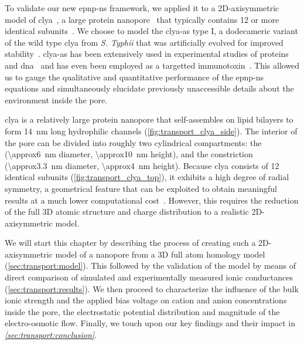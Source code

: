 To validate our new \gls{epnp-ns} framework, we applied it to a 2D-axisymmetric model of
\gls{clya}~\cite{Mueller-2009}, a large protein nanopore~\cite{Soskine-2012} that typically contains 12 or
more identical subunits~\cite{Soskine-2013,Peng-2019}. We choose to model the \gls{clya-as} type I, a
dodecameric variant of the wild type \gls{clya} from \textit{S. Typhii} that was artificially evolved for
improved stability~\cite{Soskine-2013}. \Gls{clya-as} has been extensively used in experimental studies of
proteins~\cite{Soskine-2013,VanMeervelt-2014,Soskine-Biesemans-2015,Biesemans-2015,Wloka-2017,
VanMeervelt-2017,Galenkamp-2018,Willems-Ruic-Biesemans-2019,Zernia-2020,Galenkamp-2020} and
\gls{dna}~\cite{Franceschini-2013,Franceschini-2016,Nomidis-2018} and has even been employed as a targetted
immunotoxin~\cite{Mutter-2018}. This allowed us to gauge the qualitative and quantitative performance of the
\gls{epnp-ns} equations and simultaneously elucidate previously unaccessible details about the environment
inside the pore.

\Gls{clya} is a relatively large protein nanopore that self-assembles on lipid bilayers to form \SI{14}{\nm}
long hydrophilic channels (\cref{fig:transport_clya_side}). The interior of the pore can be divided into
roughly two cylindrical compartments: the \cisi{} \lumen{} (\SI{\approx6}{\nm} diameter, \SI{\approx10}{\nm}
height), and the \transi{} constriction (\SI{\approx3.3}{\nm} diameter, \SI{\approx4}{\nm} height). Because
\gls{clya} consists of 12 identical subunits (\cref{fig:transport_clya_top}), it exhibits a high degree of
radial symmetry, a geometrical feature that can be exploited to obtain meaningful results at a much lower
computational cost~\cite{Cervera-2005,Lu-2012,Pederson-2015}. However, this requires the reduction of the full
3D atomic structure and charge distribution to a realistic 2D-axisymmetric model.

We will start this chapter by describing the process of creating such a 2D-axisymmetric model of a nanopore
from a 3D full atom homology model (\cref{sec:transport:model}). This followed by the validation of the model
by means of direct comparison of simulated and experimentally measured ionic conductances
(\cref{sec:transport:results}). We then proceed to characterize the influence of the bulk ionic strength and
the applied bias voltage on cation and anion concentrations inside the pore, the electrostatic potential
distribution and magnitude of the electro-osmotic flow. Finally, we touch upon our key findings and their
impact in \emph{\cref{sec:transport:conclusion}}.



